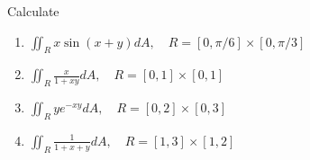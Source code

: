 \documentclass[12pt]{amsart}
\begin{document}
\begin{problem}
    Calculate
    \begin{enumerate}
        \item $\iint_R x \sin (x+y) d A, \quad R=[0, \pi / 6] \times[0, \pi / 3]$
        \item $\iint_R \frac{x}{1+x y} d A, \quad R=[0,1] \times[0,1]$
        \item  $\iint_R y e^{-x y} d A, \quad R=[0,2] \times[0,3]$
        \item  $\iint_R \frac{1}{1+x+y} d A, \quad R=[1,3] \times[1,2]$
    \end{enumerate}
\end{problem}
\end{document}
